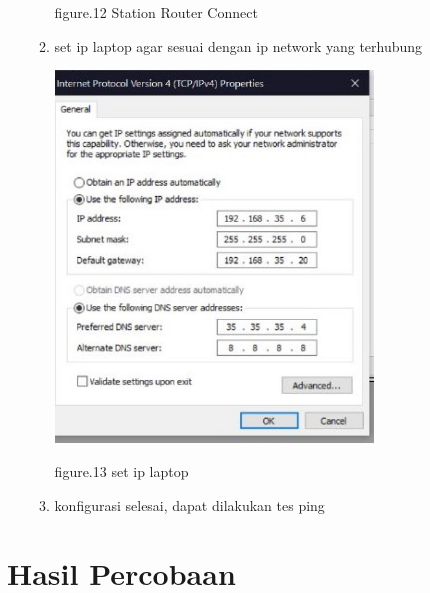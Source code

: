 \begin{enumerate}
\begin{enumerate}
\begin{center}
            figure.12 Station Router Connect
        \end{center}

        \item set ip laptop agar sesuai dengan ip network yang terhubung
        
        \begin{center}
            \includegraphics[width=0.7\textwidth]{image/P1/Wireless/3-setlaptopip.jpg}    
            
            figure.13 set ip laptop
        \end{center}

        \item konfigurasi selesai, dapat dilakukan tes ping
    \end{enumerate}
    
\end{enumerate}

\section{Hasil Percobaan}

